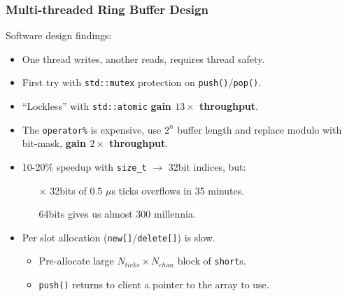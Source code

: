 \documentclass{beamer}
\begin{document}
\begin{frame}
  \frametitle{Multi-threaded Ring Buffer Design}

  Software design findings:
  \begin{itemize}
  \item One thread writes, another reads, requires thread safety.
  \item First try with \texttt{std::mutex} protection on \texttt{push()}/\texttt{pop()}.
  \item ``Lockless'' with \texttt{std::atomic} \textbf{gain $13\times$ throughput}.
  \item The \texttt{operator\%} is expensive, use $2^n$ buffer length and replace modulo with bit-mask, \textbf{gain $2\times$ throughput}.
  \item 10-20\% speedup with \texttt{size\_t} $\to$ 32bit indices, but:
    \begin{itemize}
    \item[$\times$] 32bits of 0.5 $\mu$s ticks overflows in 35 minutes.
    \item[\checkmark] 64bits gives us almost 300 millennia.
    \end{itemize}
  \item Per slot allocation (\texttt{new[]}/\texttt{delete[]}) is slow.
    \begin{itemize}
    \item Pre-allocate large $N_{ticks} \times N_{chan}$ block of \texttt{short}s.
    \item \texttt{push()} returns to client a pointer to the array to use.
    \end{itemize}
  \end{itemize}
\end{frame}
\end{document}
